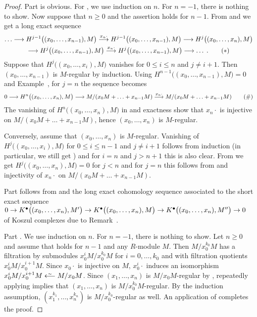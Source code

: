 \documentclass[a4paper,parskip=half,numbers=enddot, DIV=12]{scrreprt}
\renewcommand{\leq}{\leqslant}
\renewcommand{\geq}{\geqslant}
\begin{document}
\begin{proof}
	Part  is obvious. For , we use induction on $n$. For $n=-1$, there is nothing to show. Now suppose that $n\geq 0$ and the assertion holds for $n-1$. From  and  we get a long exact sequence
	\begin{multline}\lbl{eq:KoszulSeq}
		\ldots\morphism H^{j-1}\big((x_0,\ldots,x_{n-1}),M\big)\morphism[x_n\cdot ] H^{j-1}\big((x_0,\ldots,x_{n-1}),M\big)\morphism H^j\big((x_0,\ldots,x_n),M\big)\\
		\morphism H^j\big((x_0,\ldots,x_{n-1}),M\big)\morphism[x_n\cdot] H^j\big((x_0,\ldots,x_{n-1}),M\big)\morphism\ldots\;.\tag{$*$}
	\end{multline}
	Suppose that $H^j\big((x_0,\ldots,x_i),M\big)$ vanishes for $0\leq i\leq n$ and $j\neq i+1$. Then $(x_0,\ldots,x_{n-1})$ is $M$-regular by induction. Using $H^{n-1}\big((x_0,\ldots,x_{n-1}),M\big)=0$ and Example~, for $j=n$ the sequence  becomes
	\begin{align}\lbl{eq:KoszulSeq2}
		0\morphism H^n\big((x_0,\ldots,x_n),M\big)\morphism M/(x_0M+\ldots+x_{n-1}M)\morphism[ x_n\cdot]M/(x_0M+\ldots+x_{n-1}M)\tag{\#}
	\end{align}
	The vanishing of $H^n\big((x_0,\ldots,x_n),M\big)$ in  and exactness show that $x_n\cdot$ is injective on $M/(x_0M+\ldots+x_{n-1}M)$, hence $(x_0,\ldots,x_n)$ is $M$-regular.
	
	Conversely, assume that $(x_0,\ldots,x_n)$ is $M$-regular. Vanishing of $H^j\big((x_0,\ldots,x_i),M\big)$ for $0\leq i\leq n-1$ and $j\neq i+1$ follows from induction (in particular, we still get ) and for $i=n$ and $j>n+1$ this is also clear. From  we get $H^j\big((x_0,\ldots,x_n),M\big)=0$ for $j<n$ and for $j=n$ this follows from  and injectivity of $x_n\cdot$ on $M/(x_0M+\ldots+x_{n-1}M)$.
	
	
	Part  follows from  and the long exact cohomology sequence associated to the short exact sequence $0\morphism K^\bullet\big((x_0,\ldots,x_n),M'\big)\morphism K^\bullet\big((x_0,\ldots,x_n),M\big)\morphism K^\bullet\big((x_0,\ldots,x_n),M''\big)\morphism 0$ of Koszul complexes due to Remark~.
	
	Part . We use induction on $n$. For $n=-1$, there is nothing to show. Let $n\geq 0$ and assume that  holds for $n-1$ and any $R$-module $M$. Then $M/x_0^{k_0}M$ has a filtration by submodules $x_0^iM/x_0^{k_0}M$ for $i=0,\ldots,k_0$ and with filtration quotients $x_0^iM/x_0^{i+1}M$. Since $x_0\cdot$ is injective on $M$, $x_0^i\cdot$ induces an isomorphism $x_0^iM/x_0^{i+1}M\lisomorphism M/x_0M$. Since $(x_1,\ldots,x_n)$ is $M/x_0M$-regular by , repeatedly applying  implies that $(x_1,\ldots,x_n)$ is $M/x_0^{k_0}M$-regular. By the induction assumption, $(x_1^{k_1},\ldots,x_n^{k_n})$ is $M/x_0^{k_0}$-regular as well. An application of  completes the proof.
\end{proof}
\end{document}
